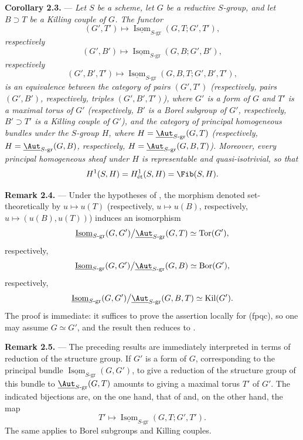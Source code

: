 \medskip\noindent\textbf{Corollary 2.3.} ---
{\itshape Let \(S\) be a scheme, let \(G\) be a reductive \(S\)-group,
and let \(B\supset T\) be a Killing couple of \(G\). The functor}
\[
  (G',T')
  \longmapsto
  \underline{\operatorname{Isom}}_{S\text{-}\mathrm{gr}}
    (G,T;G',T'),
\]
{\itshape respectively}
\[
  (G',B')
  \longmapsto
  \underline{\operatorname{Isom}}_{S\text{-}\mathrm{gr}}
    (G,B;G',B'),
\]
{\itshape respectively}
\[
  (G',B',T')
  \longmapsto
  \underline{\operatorname{Isom}}_{S\text{-}\mathrm{gr}}
    (G,B,T;G',B',T'),
\]
{\itshape is an equivalence between the category of pairs
\((G',T')\) (respectively, pairs \((G',B')\), respectively, triples
\((G',B',T')\)), where \(G'\) is a form of \(G\) and \(T'\) is a
maximal torus of \(G'\) (respectively, \(B'\) is a Borel subgroup of
\(G'\), respectively, \(B'\supset T'\) is a Killing couple of
\(G'\)), and the category of principal homogeneous bundles under
the \(S\)-group \(H\), where
\(H=\underline{\Aut}_{S\text{-}\mathrm{gr}}(G,T)\)
(respectively,
\(H=\underline{\Aut}_{S\text{-}\mathrm{gr}}(G,B)\),
respectively,
\(H=\underline{\Aut}_{S\text{-}\mathrm{gr}}(G,B,T)\)).
Moreover, every principal homogeneous sheaf under \(H\) is
representable and quasi-isotrivial, so that}
\[
  H^1(S,H)=H^1_{\mathrm{\acute et}}(S,H)=\Fib(S,H).
\]


\medskip\noindent\textbf{Remark 2.4.} ---
Under the hypotheses of , the morphism denoted set-theoretically
by \(u\mapsto u(T)\) (respectively, \(u\mapsto u(B)\), respectively,
\(u\mapsto(u(B),u(T))\)) induces an isomorphism
\[
  \underline{\operatorname{Isom}}_{S\text{-}\mathrm{gr}}(G,G')
  \big/
  \underline{\Aut}_{S\text{-}\mathrm{gr}}(G,T)
  \simeq \operatorname{Tor}(G'),
\]
respectively,
\[
  \underline{\operatorname{Isom}}_{S\text{-}\mathrm{gr}}(G,G')
  \big/
  \underline{\Aut}_{S\text{-}\mathrm{gr}}(G,B)
  \simeq \operatorname{Bor}(G'),
\]
respectively,
\[
  \underline{\operatorname{Isom}}_{S\text{-}\mathrm{gr}}(G,G')
  \big/
  \underline{\Aut}_{S\text{-}\mathrm{gr}}(G,B,T)
  \simeq \operatorname{Kil}(G').
\]
The proof is immediate: it suffices to prove the assertion locally
for \textup{(fpqc)}, so one may assume \(G\simeq G'\), and the result
then reduces to .

\medskip\noindent\textbf{Remark 2.5.} ---
The preceding results are immediately interpreted in terms of
reduction of the structure group. If \(G'\) is a form of \(G\),
corresponding to the principal bundle
\(\underline{\operatorname{Isom}}_{S\text{-}\mathrm{gr}}(G,G')\),
to give a reduction of the structure group of this bundle to
\(\underline{\Aut}_{S\text{-}\mathrm{gr}}(G,T)\) amounts to giving
a maximal torus \(T'\) of \(G'\). The indicated bijections are,
on the one hand, that of  and, on the other hand, the map
\[
  T'\longmapsto
  \underline{\operatorname{Isom}}_{S\text{-}\mathrm{gr}}
    (G,T;G',T').
\]
The same applies to Borel subgroups and Killing couples.

